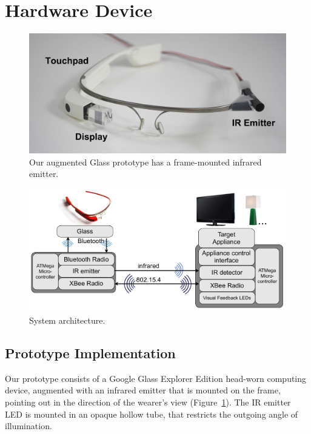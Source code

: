 

\section{Hardware Device}
\begin{figure}[t]
\centering
\includegraphics[width=1.0\columnwidth]{figures/glass-with-ir}
\caption{Our augmented Glass prototype has a frame-mounted infrared emitter.}
\label{fig:glass}
\end{figure}
\begin{figure}[t]
\centering
\includegraphics[width=1.0\columnwidth]{figures/architecture}
\caption{System architecture.}
\label{fig:architecture}
\end{figure}

\subsection{Prototype Implementation}
Our prototype consists of a Google Glass Explorer Edition head-worn computing device, augmented with an infrared emitter that is mounted on the frame, pointing out in the direction of the wearer's view (Figure~\ref{fig:glass}). The IR emitter LED is mounted in an opaque hollow tube, that restricts the outgoing angle of illumination. 

